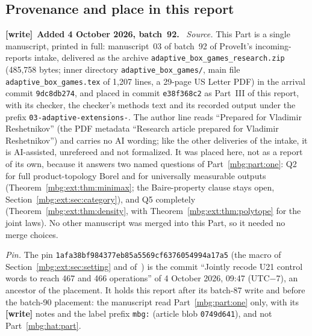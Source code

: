 \documentclass[11pt,letterpaper]{article}
\theoremstyle{definition}
\newenvironment{writenote}[1][]{\par\smallskip\begingroup\small
 \noindent\textbf{[write]}\if\relax\detokenize{#1}\relax\else~\textbf{#1.}\fi\ }%
 {\par\endgroup\smallskip}
\begin{document}
\subsection{Provenance and place in this report}
\label{mbg:ext:sec:provenance}

\begin{writenote}[Added 4 October 2026, batch~92]
\emph{Source.} This Part is a single manuscript, printed in full: manuscript~03 of batch~92 of ProveIt's incoming-reports intake, delivered as the archive \texttt{adaptive\_\allowbreak box\_\allowbreak games\_\allowbreak research.zip} (485,758 bytes; inner directory \texttt{adaptive\_\allowbreak box\_\allowbreak games/}, main file \texttt{adaptive\_\allowbreak box\_\allowbreak games.tex} of 1,207 lines, a 29-page US Letter PDF) in the arrival commit \texttt{9dc8db274}, and placed in commit \texttt{e38f368c2} as Part~III of this report, with its checker, the checker's methods text and its recorded output under the prefix \texttt{03-adaptive-extensions-}. The author line reads ``Prepared for Vladimir Reshetnikov'' (the PDF metadata ``Research article prepared for Vladimir Reshetnikov'') and carries no AI wording; like the other deliveries of the intake, it is AI-assisted, unrefereed and not formalized. It was placed here, not as a report of its own, because it answers two named questions of Part~\ref{mbg:part:one}: Q2 for full product-topology Borel and for universally measurable outputs (Theorem~\ref{mbg:ext:thm:minimax}; the Baire-property clause stays open, Section~\ref{mbg:ext:sec:category}), and Q5 completely (Theorem~\ref{mbg:ext:thm:density}, with Theorem~\ref{mbg:ext:thm:polytope} for the joint laws). No other manuscript was merged into this Part, so it needed no merge choices.

\emph{Pin.} The pin \texttt{1afa38bf984377eb85a5569cf6376054994a17a5} (the macro of Section~\ref{mbg:ext:sec:setting} and of~\cite{ext:RepoReport,ext:ProveIt}) is the commit ``Jointly recode U21 control words to reach 467 and 466 operations'' of 4 October 2026, 09:47 (UTC$-$7), an ancestor of the placement. It holds this report after its batch-87 write and before the batch-90 placement: the manuscript read Part~\ref{mbg:part:one} only, with its \textbf{[write]} notes and the label prefix \texttt{mbg:} (article blob \texttt{0749d641}), and not Part~\ref{mbg:hat:part}.


\end{writenote}
\end{document}

